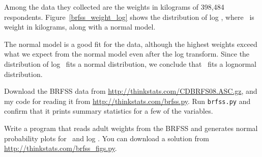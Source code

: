 \documentclass[12pt]{book}
\begin{document}
Among the data they collected are the weights in kilograms of
398,484 respondents.
Figure~\ref{brfss_weight_log} shows the distribution
of log \w, where \w~is weight in kilograms, along with a normal
model.

The normal model is a good fit for the data, although the highest
weights exceed what we expect from the normal model even after the log
transform.  Since the distribution of log \w~fits a normal distribution, we
conclude that \w~fits a lognormal distribution.






\begin{exercise}
Download the BRFSS data from 
\url{http://thinkstats.com/CDBRFS08.ASC.gz}, and my code for reading it
from
\url{http://thinkstats.com/brfss.py}.  Run {\tt brfss.py} and confirm that
it prints summary statistics for a few of the variables.

Write a program that reads adult weights from the BRFSS and
generates normal probability plots for \w~and log \w.  You can
download a solution from \url{http://thinkstats.com/brfss_figs.py}.

\end{exercise}
\end{document}
